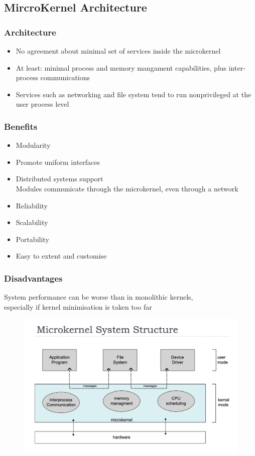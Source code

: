 \documentclass[11pt]{article}
\theoremstyle{definition}
\begin{document}
        \subsection{MircroKernel Architecture}
            \subsubsection{Architecture}
                \begin{itemize}
                    \item No agreement about minimal set of services inside the microkernel
                    \item At least: minimal process and memory mangament capabilities, plus inter-process communications
                    \item Services such as networking and file system tend to run nonprivileged at the user process level
                \end{itemize}
             \subsubsection{Benefits}
                \begin{itemize}
                    \item Modularity
                    \item Promote uniform interfaces
                    \item Distributed systems support \\
                        \hspace{1cm} Modules communicate through the microkernel, even through a network
                    \item Reliability
                    \item Scalability
                    \item Portability
                    \item Easy to extent and customise
                \end{itemize}
            \subsubsection{Disadvantages}
                System performance can be worse than in monolithic kernels, \\especially if kernel minimisation is taken too far
             \begin{figure}[htbp]
                \centering
                \includegraphics[width=0.65\linewidth]{Operating System/img/microkernel.jpg}
                \label{fig:enter-label}
            \end{figure}
\end{document}

